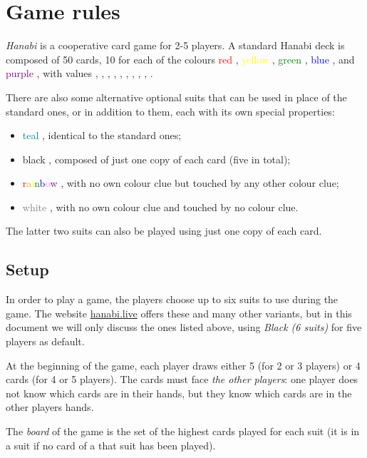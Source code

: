 \section{Game rules}

\emph{Hanabi} is a cooperative card game for 2-5 players. A standard Hanabi deck is composed of 50 cards, 10 for each of the colours \textcolor{red}{red} \red, \textcolor{yellow}{yellow} \yellow, \textcolor{green}{green} \green, \textcolor{blue}{blue} \blue, and \textcolor{purple}{purple} \purple, with values \one, \one, \one, \two, \two, \three, \three, \four, \four, \five.

There are also some alternative optional suits that can be used in place of the standard ones, or in addition to them, each with its own special properties:

\begin{itemize}
	\item \textcolor{teal}{teal} \teal, identical to the standard ones;
	\item black \black, composed of just one copy of each card (five in total);
	\item \textcolor{red}{r}\textcolor{orange}{a}\textcolor{yellow}{i}\textcolor{green}{n}\textcolor{blue}{b}\textcolor{violet}{o}\textcolor{purple}{w} \rainbow, with no own colour clue but touched by any other colour clue;
	\item \textcolor{gray}{white} \white, with no own colour clue and touched by no colour clue.
\end{itemize}

The latter two suits can also be played using just one copy of each card.


\subsection{Setup}

In order to play a game, the players choose up to six suits to use during the game. The website \href{http:/hanabi.live}{hanabi.live} offers these and many other variants, but in this document we will only discuss the ones listed above,  using \emph{Black (6 suits)} for five players as default.

At the beginning of the game, each player draws either 5 (for 2 or 3 players) or 4 cards (for 4 or 5 players). The cards must face \emph{the other players}: one player does not know which cards are in their hands, but they know which cards are in the other players hands.

\begin{definition}
	The \emph{board} of the game is the set of the highest cards played for each suit (it is  in a suit if no card of a that suit has been played).
\end{definition}

